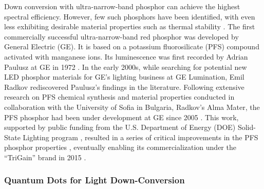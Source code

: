\documentclass[parskip=full]{article}
\begin{document}
Down conversion with ultra-narrow-band phosphor can achieve the highest spectral efficiency. However, few such phosphors have been identified, with even less exhibiting desirable material properties such as thermal stability \cite{Phillips2007}. The first commercially successful ultra-narrow-band red phosphor was developed by General Electric (GE). It is based on a potassium fluorosilicate (PFS) compound activated with manganese ions. Its luminescence was first recorded by Adrian Paulusz at GE in 1972 \cite{paulusz1973efficient}. In the early 2000s, while searching for potential new LED phosphor materials for GE’s lighting business at GE Lumination, Emil Radkov rediscovered Paulusz’s findings in the literature. Following extensive research on PFS chemical synthesis and material properties conducted in collaboration with the University of Sofia in Bulgaria, Radkov’s Alma Mater, the PFS phosphor had been under development at GE since 2005 \cite{radkov2006red}\cite{radkov2009red}. This work, supported by public funding from the U.S. Department of Energy (DOE) Solid-State Lighting program \cite{doesslprogram}, resulted in a series of critical improvements in the PFS phosphor properties \cite{Setlur2010}\cite{lyons2012color}, eventually enabling its commercialization under the “TriGain” brand in 2015 \cite{trigain_spectrum}\cite{setlur2015trigain}\cite{Murphy2015}.

\subsubsection{Quantum Dots for Light Down-Conversion}
\end{document}
